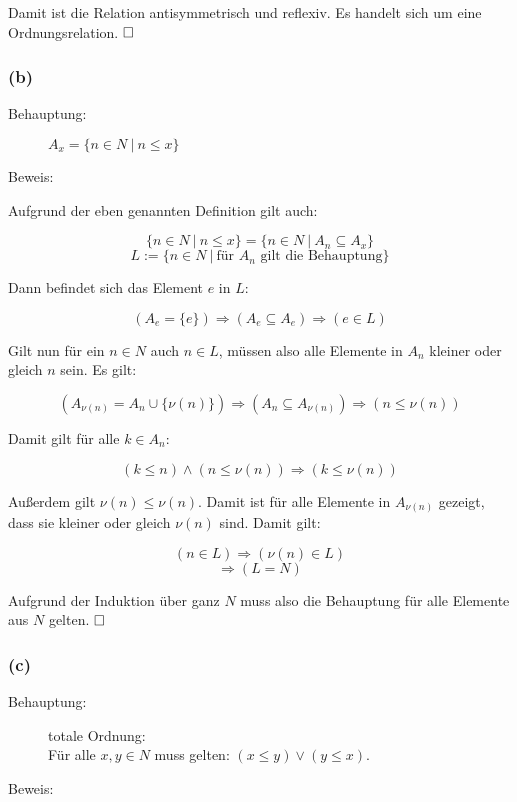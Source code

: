 \documentclass[11pt, a4paper]{article}
\begin{document}
		Damit ist die Relation antisymmetrisch und reflexiv. Es handelt sich um eine Ordnungsrelation. $\hfill \Box$


	\subsubsection*{(b)}

		\begin{description}
			\item[Behauptung:] $A_x = \{n \in N \ | \ n \leq x \}$
			\item[Beweis:]
		\end{description}

		Aufgrund der eben genannten Definition gilt auch:

		\[ \{n \in N \ | \ n \leq x \} = \{n \in N \ | \ A_n \subseteq A_x \} \]
		\[ L:= \{n \in N \ | \ \text{für $A_n$ gilt die Behauptung} \} \]

		Dann befindet sich das Element $e$ in $L$:

		\[ (A_e = \{e\}) \Rightarrow (A_e \subseteq A_e) \Rightarrow (e \in L) \]

		Gilt nun für ein $n \in N$ auch $n \in L$, müssen also alle Elemente in $A_n$ kleiner oder gleich $n$ sein. Es gilt:

		\[ (A_{\nu(n)} = A_n \cup \{\nu(n)\}) \Rightarrow (A_n \subseteq A_{\nu(n)}) \Rightarrow (n \leq \nu(n)) \]

		Damit gilt für alle $k \in A_n$:

		\[ (k \leq n)\wedge(n \leq \nu(n)) \Rightarrow (k \leq \nu(n)) \]

		Außerdem gilt $\nu(n) \leq \nu(n)$. Damit ist für alle Elemente in $A_{\nu(n)}$ gezeigt, dass sie kleiner oder gleich $\nu(n)$ sind. Damit gilt:

		\[(n \in L) \Rightarrow (\nu(n) \in L) \]
		\[ \Rightarrow (L = N) \] 

		Aufgrund der Induktion über ganz $N$ muss also die Behauptung für alle Elemente aus $N$ gelten. $\hfill \Box$


	\subsubsection*{(c)}


		\begin{description}
			\item[Behauptung:] totale Ordnung: \hfill \\
				Für alle $x,y \in N$ muss gelten: $(x \leq y) \vee (y \leq x)$.
			\item[Beweis:]
		\end{description}
\end{document}
